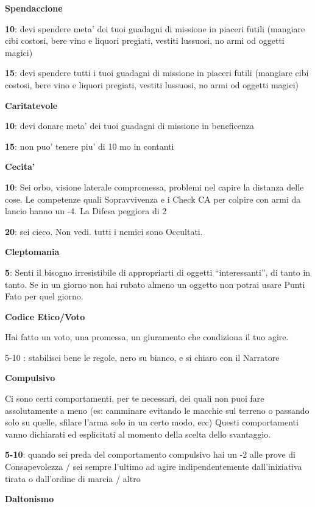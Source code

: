 \documentclass[a4paper,11pt,twoside,openany]{book}
\begin{document}
{\textbf{Spendaccione}

\textbf{10}: devi spendere meta' dei tuoi guadagni di missione in piaceri futili (mangiare cibi costosi, bere vino e liquori pregiati, vestiti lussuosi, no armi od oggetti magici)

\textbf{15}: devi spendere tutti i tuoi guadagni di missione in piaceri futili (mangiare cibi costosi, bere vino e liquori pregiati, vestiti lussuosi, no armi od oggetti magici)

\textbf{Caritatevole}

\textbf{10}: devi donare meta' dei tuoi guadagni di missione in beneficenza

\textbf{15}: non puo' tenere piu' di 10 mo in contanti

\textbf{Cecita'}

\textbf{10}: Sei orbo, visione laterale compromessa, problemi nel capire la distanza delle cose.
Le competenze quali Sopravvivenza e i Check CA per colpire con armi da lancio hanno
un -4. La Difesa peggiora di 2

\textbf{20}: sei cieco. Non vedi. tutti i nemici sono Occultati.

\textbf{Cleptomania}

\textbf{5}: Senti il bisogno irresistibile di appropriarti di oggetti “interessanti”, di tanto in tanto. Se in un giorno non hai rubato almeno un oggetto non potrai usare Punti Fato per quel giorno.

\textbf{Codice Etico/Voto}

Hai fatto un voto, una promessa, un giuramento che condiziona il tuo agire.

5-10 : stabilisci bene le regole, nero su bianco, e si chiaro con il Narratore

\textbf{Compulsivo}

Ci sono certi comportamenti, per te necessari, dei quali non puoi fare assolutamente a meno (es: camminare evitando le macchie sul terreno o passando solo su quelle, sfilare l'arma solo in un certo modo, ecc) 
Questi comportamenti vanno dichiarati ed esplicitati al momento della scelta dello svantaggio.

\textbf{5-10}: quando sei preda del comportamento compulsivo hai un -2 alle prove di Consapevolezza / sei sempre l'ultimo ad agire indipendentemente dall'iniziativa tirata o dall'ordine di marcia / altro

\textbf{Daltonismo}

}
\end{document}
